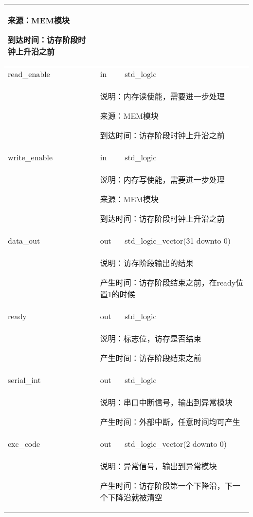 \begin{tabularx}{\textwidth}{lll}
{                来源：MEM模块

                到达时间：访存阶段时钟上升沿之前
            } \\
            \midrule
            read\_enable       & in        & std\_logic \\
            \cmidrule(l){2-3}
            &
            \multicolumn{2}{X}{
                说明：内存读使能，需要进一步处理

                来源：MEM模块

                到达时间：访存阶段时钟上升沿之前
            } \\
            \midrule
            write\_enable & in      & std\_logic \\
            \cmidrule(l){2-3}
            &
            \multicolumn{2}{X}{
                说明：内存写使能，需要进一步处理

                来源：MEM模块

                到达时间：访存阶段时钟上升沿之前
            } \\
            \midrule
            data\_out      & out        & std\_logic\_vector(31 downto 0) \\
            \cmidrule(l){2-3}
            &
            \multicolumn{2}{X}{
                说明：访存阶段输出的结果

                产生时间：访存阶段结束之前，在ready位置1的时候
            } \\
            \midrule
            ready   & out        & std\_logic \\
            \cmidrule(l){2-3}
            &
            \multicolumn{2}{X}{
                说明：标志位，访存是否结束

                产生时间：访存阶段结束之前
            } \\
            \midrule
            serial\_int      & out       & std\_logic \\
            \cmidrule(l){2-3}
            &
            \multicolumn{2}{X}{
                说明：串口中断信号，输出到异常模块

                产生时间：外部中断，任意时间均可产生
            } \\
            \midrule
            exc\_code      & out       & std\_logic\_vector(2 downto 0) \\
            \cmidrule(l){2-3}
            &
            \multicolumn{2}{X}{
                说明：异常信号，输出到异常模块

                产生时间：访存阶段第一个下降沿，下一个下降沿就被清空

}
\end{tabularx}
